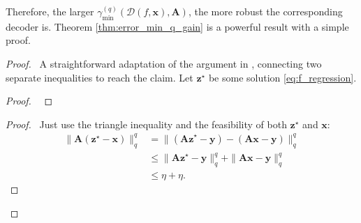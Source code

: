 Therefore, the larger $\gamma_{\min}^{(q)} \left ( \mathcal{D}( f, \mathbf{x}), \mathbf{A} \right )$, the more robust the corresponding decoder is. Theorem \ref{thm:error_min_q_gain} is a powerful result with a simple proof.

\clearpage

\begin{proof}
    \pf\ A straightforward adaptation of the argument in \cite[~Theorem 4]{kabanava2015a}, connecting two separate inequalities to reach the claim. Let $\mathbf{z}^\star$ be some solution \eqref{eq:f_regression}.
        \begin{proof}
            \pf
            ~\qedsymbol
        \end{proof}
        \begin{proof}
            \pf\ Just use the triangle inequality and the feasibility of both $\mathbf{z}^\star$ and $\mathbf{x}$:
            \begin{align*}
                \| \mathbf{A} (\mathbf{z}^\star - \mathbf{x})\|_q^q & = \| (\mathbf{Az}^\star - \mathbf{y}) - (\mathbf{Ax} - \mathbf{y})\|_q^q \\
                & \leq \| \mathbf{Az}^\star - \mathbf{y} \|_q^q + \| \mathbf{Ax} - \mathbf{y}\|_q^q \\
                & \leq \eta + \eta.
            \end{align*}
            \qedsymbol
        \end{proof}
\end{proof}

